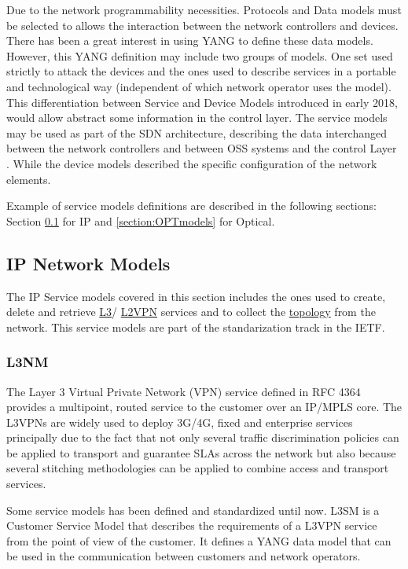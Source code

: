 \documentclass[a4paper,fleqn]{cas-dc}
\begin{document}
Due to the network programmability necessities. Protocols and Data models must be selected to allows the interaction between the network controllers and devices. There has been a great interest in using YANG to define these data models. However, this YANG definition may include two groups of models. One set used strictly to attack the devices and the ones used to describe services in a portable and technological way (independent of which network operator uses the model). 
This differentiation between Service and Device Models introduced in early 2018, would allow abstract some information in the control layer. The service models may be used as part of the SDN architecture, describing the data interchanged between the network controllers and between OSS systems and the control Layer \cite{wu2017service}. While the device models described the specific configuration of the network elements. 

Example of service models definitions are described in the following sections: Section \ref{section:IPmodels} for IP and \ref{section:OPTmodels} for Optical.

\subsection{IP Network Models}
\label{section:IPmodels}

The IP Service models covered in this section includes the ones used to create, delete and retrieve \hyperref[section:l3nm]{L3}/ \hyperref[section:l2nm]{L2VPN} services and to collect the \hyperref[section:topo]{topology} from the network. This service models are part of the standarization track in the IETF. 

\subsubsection{L3NM}
\label{section:l3nm}
The Layer 3 Virtual Private Network (VPN) service defined in RFC 4364 \cite{rosen2006rfc} provides a multipoint, routed service to the customer over an IP/MPLS core. The L3VPNs are widely used to deploy 3G/4G, fixed and enterprise services principally due to the fact that not only several traffic discrimination policies can be applied to transport and guarantee SLAs across the network but also because several stitching methodologies can be applied to combine access and transport services. 

Some service models has been defined and standardized until now. L3SM \cite{rfc8299} is a Customer Service Model that describes the requirements of a L3VPN service from the point of view of the customer. It defines a YANG data model that can be used in the communication between customers and network operators. 
\end{document}
